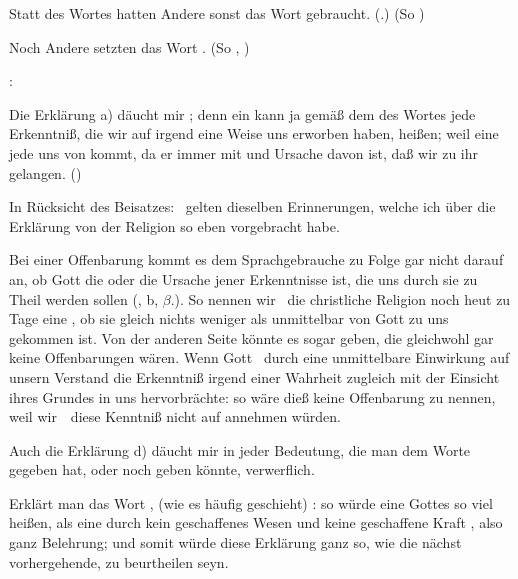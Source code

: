 \begin{aufza}
\begin{aufzb}
\item Statt des Wortes  hatten Andere sonst das Wort  gebraucht. (.) (So  \uA )
\item Noch Andere setzten das Wort . (So ,  \uA )
\end{aufzb}
:
\begin{aufzb} 
\item Die Erklärung a) däucht mir ; denn ein  kann ja gemäß dem  des Wortes  jede Erkenntniß, die wir auf irgend eine Weise uns erworben haben, heißen; weil eine jede uns von  kommt, da er immer mit  und  Ursache davon ist, daß wir zu ihr gelangen. ()
\item In Rücksicht des Beisatzes:  \usw\ gelten dieselben Erinnerungen, welche ich über die Erklärung von der  Religion so eben vorgebracht habe.
\item Bei einer Offenbarung kommt es dem Sprachgebrauche zu Folge gar nicht darauf an, ob Gott die  oder die  Ursache jener Erkenntnisse ist, die uns durch sie zu Theil werden sollen (, b, $\beta$.). So nennen wir \zB\ die christliche Religion noch heut zu Tage eine , ob sie gleich nichts weniger als unmittelbar von Gott zu uns gekommen ist. Von der anderen Seite könnte es sogar  geben, die gleichwohl gar keine Offenbarungen wären. Wenn Gott \zB\ durch eine unmittelbare Einwirkung auf unsern Verstand die Erkenntniß irgend einer Wahrheit zugleich mit der Einsicht ihres Grundes in uns hervorbrächte: so wäre dieß keine Offenbarung zu nennen, weil wir~\ diese Kenntniß nicht auf  annehmen würden.
\item Auch die Erklärung d) däucht mir in jeder Bedeutung, die man dem Worte  gegeben hat, oder noch geben könnte, verwerflich.
\begin{aufzc}
\item Erklärt man das Wort , (wie es häufig geschieht) : so würde eine  Gottes so viel heißen, als eine durch kein geschaffenes Wesen und keine geschaffene Kraft , also ganz  Belehrung; und somit würde diese Erklärung ganz so, wie die nächst vorhergehende, zu beurtheilen seyn.

\end{aufzc}
\end{aufzb}
\end{aufza}
